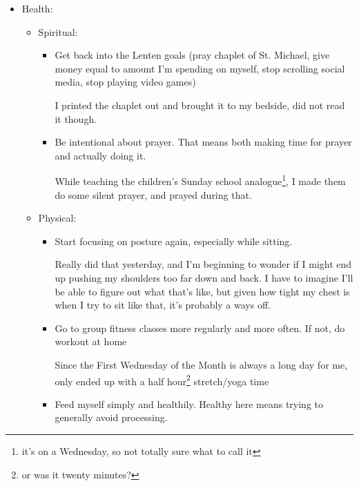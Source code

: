 \documentclass[12pt]{article}[titlepage]
\newcommand{\1}{\={a}}
\newcommand{\2}{\={e}}
\newcommand{\3}{\={\i}}
\newcommand{\4}{\=o}
\newcommand{\5}{\=u}
\newcommand{\6}{\={A}}
\renewcommand{\,}{\textsuperscript{,}}
\begin{document}
\begin{itemize}
\begin{itemize}
The old\footnote{read: mid 1900s} articles are in Zotero now.  
\item Work towards future career:   
\begin{itemize}   
\item Figure out the difference between my public-facing and field-facing presentation affects. As I focus on becoming a better presenter, I need to become aware of the difference and how to switch them.  
\item Need to look for jobs  
\end{itemize}   
\end{itemize}   
\item Health:  
\begin{itemize}   
\item Spiritual:   
\begin{itemize}   
\item Get back into the Lenten goals (pray chaplet of St. Michael, give money equal to amount I'm spending on myself, stop scrolling social media, stop playing video games)

I printed the chaplet out and brought it to my bedside, did not read it though.  
\item Be intentional about prayer. That means both making time for prayer and actually doing it.  
  
While teaching the children's Sunday school analogue\footnote{it's on a Wednesday, so not totally sure what to call it}, I made them do some silent prayer, and prayed during that.  
\end{itemize}   
\item Physical:   
\begin{itemize}   
\item Start focusing on posture again, especially while sitting.

Really did that yesterday, and I'm beginning to wonder if I might end up pushing my shoulders too far down and back. I have to imagine I'll be able to figure out what that's like, but given how tight my chest is when I try to sit like that, it's probably a ways off.  
\item Go to group fitness classes more regularly and more often. If not, do workout at home

Since the First Wednesday of the Month is always a long day for me, only ended up with a half hour\footnote{or was it twenty minutes?} stretch/yoga time  
\item Feed myself simply and healthily. Healthy here means trying to generally avoid processing.


\end{itemize}
\end{itemize}
\end{itemize}
\end{document}
